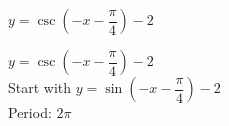 {$y = \csc \left( -x - \dfrac{\pi}{4} \right) - 2$}
{$y = \csc \left( -x - \dfrac{\pi}{4} \right) - 2$\\
Start with $y = \sin \left( -x - \dfrac{\pi}{4} \right) - 2$ \\
Period: $2\pi$

\begin{center}
\end{center}
}
